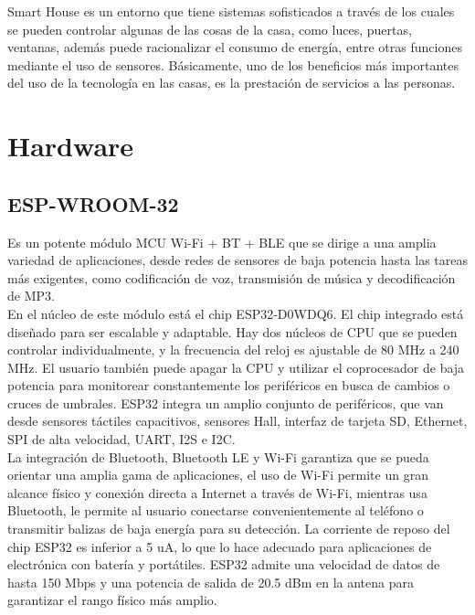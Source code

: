 Smart House es un entorno que tiene sistemas sofisticados a través de los cuales se pueden controlar algunas de las cosas de la casa, como luces, puertas, ventanas, además  puede racionalizar el consumo de energía, entre otras funciones mediante el uso de sensores. Básicamente, uno de los beneficios más importantes del uso de la tecnología en las casas, es la prestación de servicios a las personas.\cite{Howedi2016} \\

\section{Hardware}

\subsection{ESP-WROOM-32}
Es un potente módulo MCU Wi-Fi + BT + BLE que se dirige a una amplia variedad de aplicaciones, desde redes de sensores de baja potencia hasta las tareas más exigentes, como codificación de voz, transmisión de música y decodificación de MP3.\\

En el núcleo de este módulo está el chip ESP32-D0WDQ6. El chip integrado está diseñado para ser escalable y adaptable. Hay dos núcleos de CPU que se pueden controlar individualmente, y la frecuencia del reloj es ajustable de 80 MHz a 240 MHz. El usuario también puede apagar la CPU y utilizar el coprocesador de baja potencia para monitorear constantemente los periféricos en busca de cambios o cruces de umbrales. ESP32 integra un amplio conjunto de periféricos, que van desde sensores táctiles capacitivos, sensores Hall, interfaz de tarjeta SD, Ethernet, SPI de alta velocidad, UART, I2S e I2C.\\

La integración de Bluetooth, Bluetooth LE y Wi-Fi garantiza que se pueda orientar una amplia gama de aplicaciones, el uso de Wi-Fi permite un gran alcance físico y conexión directa a Internet a través de Wi-Fi, mientras usa Bluetooth, le permite al usuario conectarse convenientemente al teléfono o transmitir balizas de baja energía para su detección. La corriente de reposo del chip ESP32 es inferior a 5 uA, lo que lo hace adecuado para aplicaciones de electrónica con batería y portátiles. ESP32 admite una velocidad de datos de hasta 150 Mbps y una potencia de salida de 20.5 dBm en la antena para garantizar el rango físico más amplio.\\

